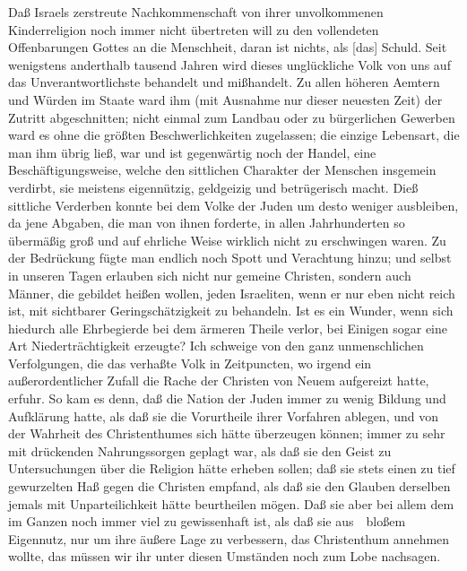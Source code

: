 \begin{aufza}
\item Daß Israels zerstreute Nachkommenschaft von ihrer unvolkommenen Kinderreligion noch immer nicht übertreten will zu den vollendeten Offenbarungen Gottes an die Menschheit, daran ist nichts, als [das]  Schuld. Seit wenigstens anderthalb tausend Jahren wird dieses unglückliche Volk von uns auf das Unverantwortlichste behandelt und mißhandelt. Zu allen höheren Aemtern und Würden im Staate ward ihm (mit Ausnahme nur dieser neuesten Zeit) der Zutritt abgeschnitten; nicht einmal zum Landbau oder zu bürgerlichen Gewerben ward es ohne die größten Beschwerlichkeiten zugelassen; die einzige Lebensart, die man ihm übrig ließ, war und ist gegenwärtig noch der Handel, eine Beschäftigungsweise, welche den sittlichen Charakter der Menschen insgemein verdirbt, sie meistens eigennützig, geldgeizig und betrügerisch macht. Dieß sittliche Verderben konnte bei dem Volke der Juden um desto weniger ausbleiben, da jene Abgaben, die man von ihnen forderte, in allen Jahrhunderten so übermäßig groß und auf ehrliche Weise wirklich nicht zu erschwingen waren. Zu der Bedrückung fügte man endlich noch Spott und Verachtung hinzu; und selbst in unseren Tagen erlauben sich nicht nur gemeine Christen, sondern auch Männer, die gebildet heißen wollen, jeden Israeliten, wenn er nur eben nicht reich ist, mit sichtbarer Geringschätzigkeit zu behandeln. Ist es ein Wunder, wenn sich hiedurch alle Ehrbegierde bei dem ärmeren Theile verlor, bei Einigen sogar eine Art Niederträchtigkeit erzeugte? Ich schweige von den ganz unmenschlichen Verfolgungen, die das verhaßte Volk in Zeitpuncten, wo irgend ein außerordentlicher Zufall die Rache der Christen von Neuem aufgereizt hatte, erfuhr. So kam es denn, daß die Nation der Juden immer zu wenig Bildung und Aufklärung hatte, als daß sie die Vorurtheile ihrer Vorfahren ablegen, und von der Wahrheit des Christenthumes sich hätte überzeugen können; immer zu sehr mit drückenden Nahrungssorgen geplagt war, als daß sie den Geist zu Untersuchungen über die Religion hätte erheben sollen; daß sie stets einen zu tief gewurzelten Haß gegen die Christen empfand, als daß sie den Glauben derselben jemals mit Unparteilichkeit hätte beurtheilen mögen. Daß sie aber bei allem dem im Ganzen noch immer viel zu gewissenhaft ist, als daß sie aus~\ bloßem Eigennutz, nur um ihre äußere Lage zu verbessern, das Christenthum annehmen wollte, das müssen wir ihr unter diesen Umständen noch zum Lobe nachsagen.

\end{aufza}
